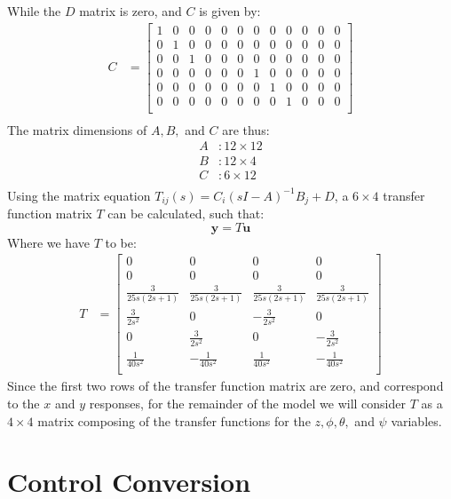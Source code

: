 \documentclass[12pt]{article}
\begin{document}
While the $D$ matrix is zero, and $C$ is given by:
\begin{align*}
  C &= 
  \begin{bmatrix}
  1 & 0 & 0 & 0 & 0 & 0 & 0 & 0 & 0 & 0 & 0 & 0 \\
  0 & 1 & 0 & 0 & 0 & 0 & 0 & 0 & 0 & 0 & 0 & 0 \\
  0 & 0 & 1 & 0 & 0 & 0 & 0 & 0 & 0 & 0 & 0 & 0 \\
  0 & 0 & 0 & 0 & 0 & 0 & 1 & 0 & 0 & 0 & 0 & 0 \\
  0 & 0 & 0 & 0 & 0 & 0 & 0 & 1 & 0 & 0 & 0 & 0 \\
  0 & 0 & 0 & 0 & 0 & 0 & 0 & 0 & 1 & 0 & 0 & 0 \\
  \end{bmatrix} \\
\end{align*}
The matrix dimensions of $A, B,$ and $C$ are thus:
\begin{align*}
  A &: 12\times12\\
  B &: 12\times4\\
  C &: 6\times12\\
\end{align*}
Using the matrix equation $T_{ij}(s) = C_i(sI - A)^{-1}B_j + D$, 
a $6\times4$ transfer function matrix $T$ can be calculated, such that:
  $$\textbf{y} = T\textbf{u}$$
Where we have $T$ to be:
\begin{align*}
  T &= 
  \begin{bmatrix}
    0 & 0 & 0 & 0 \\
    0 & 0 & 0 & 0 \\[6pt]
    \frac{3}{25s(2s + 1)} & \frac{3}{25s(2s + 1)} & \frac{3}{25s(2s + 1)} & \frac{3}{25s(2s + 1)} \\[6pt]
    \frac{3}{2s^2} & 0 & -\frac{3}{2s^2} & 0 \\[6pt]
    0 & \frac{3}{2s^2} & 0 & -\frac{3}{2s^2} \\[6pt]
    \frac{1}{40s^2} & -\frac{1}{40s^2} & \frac{1}{40s^2} & -\frac{1}{40s^2} \\[6pt]
  \end{bmatrix}
\end{align*}
Since the first two rows of the transfer function matrix are zero, and correspond to the $x$ and $y$ responses,
for the remainder of the model we will consider $T$ as a $4\times4$ matrix composing of the transfer functions
for the $z,\phi, \theta,$ and $\psi$ variables.
\section{Control Conversion}
\end{document}
